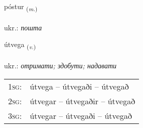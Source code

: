 \documentclass[frontgrid, backgrid]{flacards}\usepackage[]{graphicx}\usepackage[]{xcolor}
\begin{document}
\renewcommand{\flhead}{\vskip5pt \fboxsep=0pt {\small\bfseries\footnotesize Nafnorð | іменник}}
\renewcommand{\fcfoot}{\vskip5pt \fboxsep=0pt \hspace{2pt}{\small\bfseries\footnotesize 3K}}

\renewcommand{\blhead}{\vskip5pt {\small\bfseries\footnotesize Nafnorð | іменник }}
\renewcommand{\bcfoot}{\vskip5pt \hspace{2pt}{\small\bfseries\footnotesize 3K}}


{póstur \small{\textsubscript{(\textit{m.})}} \\[1ex] %
\textphonetic{[pʰoustʏr]} \\
ukr.: \emph{пошта} \\  [2ex]
\renewcommand*{\arraystretch}{0.8}
}

\renewcommand{\flhead}{\vskip5pt \fboxsep=0pt {\small\bfseries\footnotesize Sagnorð | дієслово}}
\renewcommand{\fcfoot}{\vskip5pt \fboxsep=0pt \hspace{2pt}{\small\bfseries\footnotesize 3K}}

\renewcommand{\blhead}{\vskip5pt {\small\bfseries\footnotesize Sagnorð | дієслово }}
\renewcommand{\bcfoot}{\vskip5pt \hspace{2pt}{\small\bfseries\footnotesize 3K}}


{útvega \small{\textsubscript{(\textit{v.})}} \\[1ex] %
\textphonetic{[uːtvɛɣa]} \\
ukr.: \emph{отримати; здобути; надавати} \\  [2ex]
\renewcommand*{\arraystretch}{0.8}
\begin{tabular}{p{1cm}l}
\textsc{1sg}: & útvega -- útvegaði -- útvegað \\ 
\textsc{2sg}: & útvegar -- útvegaðir -- útvegað \\ 
\textsc{3sg}: & útvegar -- útvegaði -- útvegað \\ 
\end{tabular}
}
\end{document}
